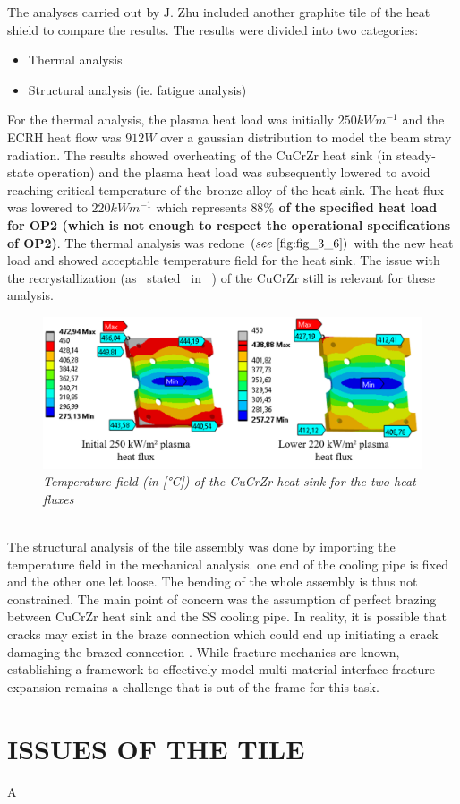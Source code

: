 \normalsize{\indent The analyses carried out by J. Zhu included another graphite tile of the heat shield to compare the results. The results were divided into two categories:
\begin{itemize}
    \item Thermal analysis
    \item Structural analysis (ie. fatigue analysis)
\end{itemize}
For the thermal analysis, the plasma heat load was initially $250 \unit{kWm^{-1}}$ and the \acrshort{ECRH} heat flow was $912 \unit{W}$ over a gaussian distribution to model the beam stray radiation. The results showed overheating of the \acrshort{CuCrZr} heat sink (in steady-state operation) and the plasma heat load was subsequently lowered to avoid reaching critical temperature of the bronze alloy of the heat sink. The heat flux was lowered to $220 \unit{kWm^{-1}}$ which represents {\bfseries $88 \unit{\%}$ of the specified heat load for \acrshort{OP2} (which is not enough to respect the operational specifications of \acrshort{OP2})}. The thermal analysis was redone $(see \ \ref{fig:fig_3_6})$ with the new heat load and showed acceptable temperature field for the heat sink. The issue with the recrystallization (as \ stated \ in \ \cite{Fellinger_2013}) of the \acrshort{CuCrZr} still is relevant for these analysis.}
\begin{figure}[h!]
    \centering
    \includegraphics[width=1\textwidth]{figures/jZhuHS250vs220II.png}
    \caption{\it Temperature field (in [\si{\degree}C]) of the \acrshort{CuCrZr} heat sink for the two heat fluxes \cite{zhu_parametric_2019}}
    \label{fig:fig_3_6}
\end{figure}
\\
\break
\normalsize{\indent The structural analysis of the tile assembly was done by importing the temperature field in the mechanical analysis. one end of the cooling pipe is fixed and the other one let loose. The bending of the whole assembly is thus not constrained. The main point of concern was the assumption of perfect brazing between \acrshort{CuCrZr} heat sink and the \acrshort{SS} cooling pipe. In reality, it is possible that cracks may exist in the braze connection which could end up initiating a crack damaging the brazed connection \cite{zhu_parametric_2019}. While fracture mechanics are known, establishing a framework to effectively model multi-material interface fracture expansion remains a challenge that is out of the frame for this task.}
\section{ISSUES OF THE TILE}
\normalsize{ A}